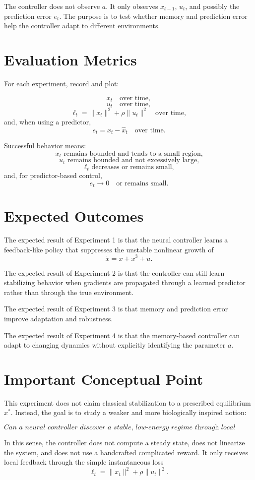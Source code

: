 \documentclass[11pt]{ctexart}
\begin{document}
The controller does not observe \(a\). It only observes \(x_{t-1}\), \(u_t\), and possibly the prediction error \(e_t\). The purpose is to test whether memory and prediction error help the controller adapt to different environments.

\section{Evaluation Metrics}

For each experiment, record and plot:

\[
x_t \quad \text{over time},
\]
\[
u_t \quad \text{over time},
\]
\[
\ell_t=\|x_t\|^2+\rho\|u_t\|^2 \quad \text{over time},
\]
and, when using a predictor,
\[
e_t=x_t-\hat x_t \quad \text{over time}.
\]

Successful behavior means:
\[
x_t \text{ remains bounded and tends to a small region,}
\]
\[
u_t \text{ remains bounded and not excessively large,}
\]
\[
\ell_t \text{ decreases or remains small,}
\]
and, for predictor-based control,
\[
e_t \to 0 \quad \text{or remains small.}
\]

\section{Expected Outcomes}

The expected result of Experiment 1 is that the neural controller learns a feedback-like policy that suppresses the unstable nonlinear growth of
\[
\dot x=x+x^3+u.
\]

The expected result of Experiment 2 is that the controller can still learn stabilizing behavior when gradients are propagated through a learned predictor rather than through the true environment.

The expected result of Experiment 3 is that memory and prediction error improve adaptation and robustness.

The expected result of Experiment 4 is that the memory-based controller can adapt to changing dynamics without explicitly identifying the parameter \(a\).

\section{Important Conceptual Point}

This experiment does not claim classical stabilization to a prescribed equilibrium \(x^*\). Instead, the goal is to study a weaker and more biologically inspired notion:

\[
\textit{Can a neural controller discover a stable, low-energy regime through local online learning?}
\]

In this sense, the controller does not compute a steady state, does not linearize the system, and does not use a handcrafted complicated reward. It only receives local feedback through the simple instantaneous loss
\[
\ell_t=\|x_t\|^2+\rho\|u_t\|^2.
\]
\end{document}
